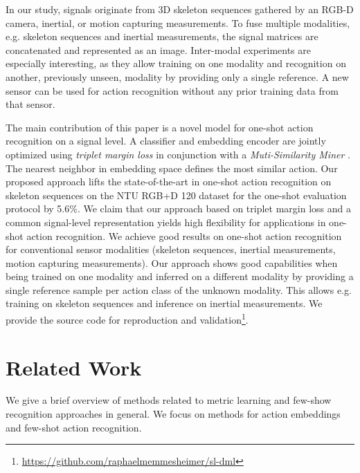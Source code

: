 \documentclass[10pt,conference,a4paper]{IEEEtran}
\def\ntuoneshotimpro{5.6}
\begin{document}
In our study, signals originate from 3D skeleton sequences gathered by an RGB-D camera, inertial, or motion capturing measurements. 
To fuse multiple modalities, e.g. skeleton sequences and inertial measurements, the signal matrices are concatenated and represented as an image.
Inter-modal experiments are especially interesting, as they allow training on one modality and recognition on another, previously unseen, modality by providing only a single reference. A new sensor can be used for action recognition without any prior training data from that sensor. 

 






























The main contribution of this paper is a novel model for one-shot action recognition on a signal level. A classifier and embedding encoder are jointly optimized using \textit{triplet margin loss} \cite{weinberger2009distance} in conjunction with a \textit{Muti-Similarity Miner} \cite{wang2019multi}. The nearest neighbor in embedding space defines the most similar action.
Our proposed approach lifts the state-of-the-art in one-shot action recognition on skeleton sequences on the NTU RGB+D 120 dataset for the one-shot evaluation protocol by \ntuoneshotimpro\%.
We claim that our approach based on triplet margin loss and a common signal-level representation yields high flexibility for applications in one-shot action recognition. We achieve good results on one-shot action recognition for conventional sensor modalities (skeleton sequences, inertial measurements, motion capturing measurements). Our approach shows good capabilities when being trained on one modality and inferred on a different modality by providing a single reference sample per action class of the unknown modality. This allows e.g. training on skeleton sequences and inference on inertial measurements. We provide the source code for reproduction and validation\footnote{\url{https://github.com/raphaelmemmesheimer/sl-dml}}.
%
 
\section{Related Work}
We give a brief overview of methods related to metric learning and few-show recognition approaches in general. We focus on methods for action embeddings and few-shot action recognition.
\end{document}
